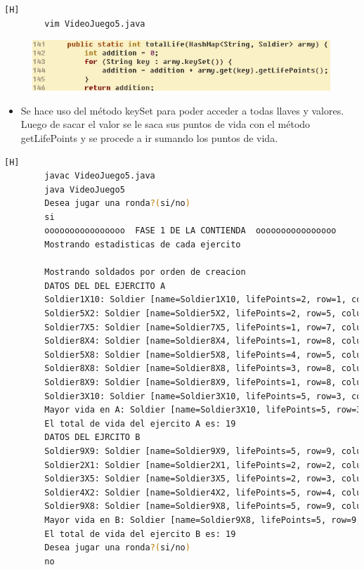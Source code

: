 \documentclass{article}
\begin{document}
	\begin{lstlisting}[language=bash,caption={Se modifica el método retorna la suma de la cantidad de puntos del ejército}][H]
		vim VideoJuego5.java
	\end{lstlisting}
	
	\begin{figure}[H]
		\centering
		\includegraphics[width=1\textwidth,keepaspectratio]{img/totalLife.jpg}
	\end{figure}
	
		
	\begin{itemize}	
		\item Se hace uso del método keySet para poder acceder a todas llaves y valores. Luego de sacar el valor se le saca sus puntos de vida con el método getLifePoints y se procede a ir sumando los puntos de vida.
	\end{itemize}
	
	
	\begin{lstlisting}[language=bash,caption={Compilando y probando }][H]
		javac VideoJuego5.java
		java VideoJuego5
		Desea jugar una ronda?(si/no)
		si
		oooooooooooooooo  FASE 1 DE LA CONTIENDA  oooooooooooooooo
		Mostrando estadisticas de cada ejercito
		
		Mostrando soldados por orden de creacion
		DATOS DEL DEL EJERCITO A
		Soldier1X10: Soldier [name=Soldier1X10, lifePoints=2, row=1, column=10]
		Soldier5X2: Soldier [name=Soldier5X2, lifePoints=2, row=5, column=2]
		Soldier7X5: Soldier [name=Soldier7X5, lifePoints=1, row=7, column=5]
		Soldier8X4: Soldier [name=Soldier8X4, lifePoints=1, row=8, column=4]
		Soldier5X8: Soldier [name=Soldier5X8, lifePoints=4, row=5, column=8]
		Soldier8X8: Soldier [name=Soldier8X8, lifePoints=3, row=8, column=8]
		Soldier8X9: Soldier [name=Soldier8X9, lifePoints=1, row=8, column=9]
		Soldier3X10: Soldier [name=Soldier3X10, lifePoints=5, row=3, column=10]
		Mayor vida en A: Soldier [name=Soldier3X10, lifePoints=5, row=3, column=10]
		El total de vida del ejercito A es: 19
		DATOS DEL EJRCITO B
		Soldier9X9: Soldier [name=Soldier9X9, lifePoints=5, row=9, column=9]
		Soldier2X1: Soldier [name=Soldier2X1, lifePoints=2, row=2, column=1]
		Soldier3X5: Soldier [name=Soldier3X5, lifePoints=2, row=3, column=5]
		Soldier4X2: Soldier [name=Soldier4X2, lifePoints=5, row=4, column=2]
		Soldier9X8: Soldier [name=Soldier9X8, lifePoints=5, row=9, column=8]
		Mayor vida en B: Soldier [name=Soldier9X8, lifePoints=5, row=9, column=8]
		El total de vida del ejercito B es: 19
		Desea jugar una ronda?(si/no)
		no
	\end{lstlisting}
	
\end{document}

